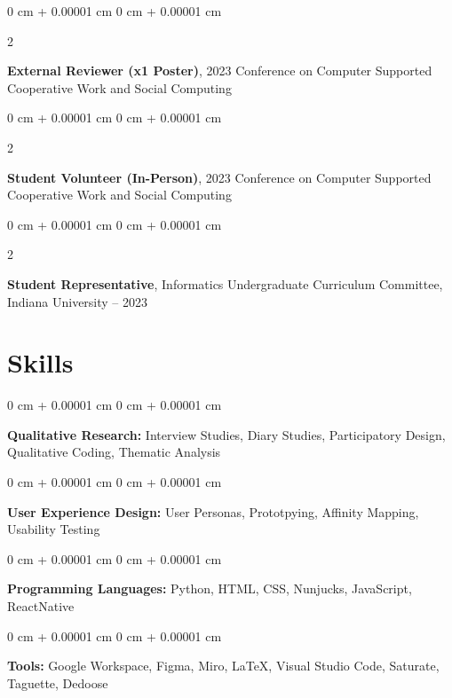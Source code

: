 \documentclass[10pt, letterpaper]{article}
\newenvironment{onecolentry}{
    \begin{adjustwidth}{
        0 cm + 0.00001 cm
    }{
        0 cm + 0.00001 cm
    }
}{
    \end{adjustwidth}
} %
\newenvironment{twocolentry}[2][]{
    \onecolentry
    \def\secondColumn{#2}
    \setcolumnwidth{\fill, 4.0 cm}
    \begin{paracol}{2}
}{
    \switchcolumn \raggedleft \secondColumn
    \end{paracol}
    \endonecolentry
} %
\begin{document}
        \vspace{0.21 cm}

        \begin{twocolentry}{
            2023
        }
            \textbf{External Reviewer (x1 Poster)}, 2023 Conference on Computer Supported Cooperative Work and Social Computing\end{twocolentry}



        \vspace{0.21 cm}

        \begin{twocolentry}{
            2023
        }
            \textbf{Student Volunteer (In-Person)}, 2023 Conference on Computer Supported Cooperative Work and Social Computing\end{twocolentry}



        \vspace{0.21 cm}

        \begin{twocolentry}{
            2022 – 2023
        }
            \textbf{Student Representative}, Informatics Undergraduate Curriculum Committee, Indiana University\end{twocolentry}




    
    \section{Skills}



        
        \begin{onecolentry}
            \textbf{Qualitative Research:} Interview Studies, Diary Studies, Participatory Design, Qualitative Coding, Thematic Analysis
        \end{onecolentry}

        \vspace{0.21 cm}

        \begin{onecolentry}
            \textbf{User Experience Design:} User Personas, Prototpying, Affinity Mapping, Usability Testing
        \end{onecolentry}

        \vspace{0.21 cm}

        \begin{onecolentry}
            \textbf{Programming Languages:} Python, HTML, CSS, Nunjucks, JavaScript, ReactNative
        \end{onecolentry}

        \vspace{0.21 cm}

        \begin{onecolentry}
            \textbf{Tools:} Google Workspace, Figma, Miro, LaTeX, Visual Studio Code, Saturate, Taguette, Dedoose
        \end{onecolentry}


    
\end{document}

